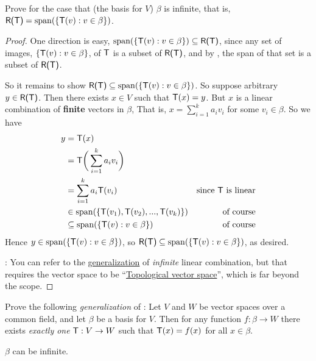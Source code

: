 \begin{exercise} \label{exercise 2.1.34}
Prove  for the case that (the basis for \(V\)) \(\beta\) is infinite,
that is, \(\textsf{R(T)} = \operatorname{span}(\{ \textsf{T}(v) : v \in \beta \})\).
\end{exercise}

\begin{proof}
One direction is easy, \(\operatorname{span}(\{ \textsf{T}(v) : v \in \beta \}) \subseteq \textsf{R(T)}\), since any set of images, \(\{ \textsf{T}(v) : v \in \beta \}\), of \(\textsf{T}\) is a subset of \(\textsf{R(T)}\), and by , the span of that set is a subset of \(\textsf{R(T)}\).

So it remains to show \(\textsf{R(T)} \subseteq \operatorname{span}(\{ \textsf{T}(v) : v \in \beta \})\).
So suppose arbitrary \(y \in \textsf{R(T)}\).
Then there exists \(x \in V\) such that \(\textsf{T}(x) = y\).
But \(x\) is a linear combination of \textbf{finite}\RED{*} vectors in \(\beta\),
That is, \(x = \sum_{i = 1}^k a_i v_i\) for some \(v_i \in \beta\).
So we have
\begin{align*}
    y & = \textsf{T}(x) \\
      & = \textsf{T}\bigg(\sum_{i = 1}^k a_i v_i\bigg) \\
      & = \sum_{i = 1}^k a_i \textsf{T}(v_i) & \text{since \(\textsf{T}\) is linear} \\
      & \in \operatorname{span}(\{ \textsf{T}(v_1), \textsf{T}(v_2), ..., \textsf{T}(v_k) \}) & \text{of course} \\
      & \subseteq \operatorname{span}(\{ \textsf{T}(v) : v \in \beta \}) & \text{of course}
\end{align*}
Hence \(y \in \operatorname{span}(\{ \textsf{T}(v) : v \in \beta \})\), so \(\textsf{R(T)} \subseteq \operatorname{span}(\{ \textsf{T}(v) : v \in \beta \})\), as desired.

\RED{*}: You can refer to the \href{https://www.wikiwand.com/en/Linear_combination#/Generalizations}{generalization} of \emph{infinite} linear combination, but that requires the vector space to be ``\href{https://www.wikiwand.com/en/Topological_vector_space}{Topological vector space}'', which is far beyond the scope.
\end{proof}

\begin{exercise} \label{exercise 2.1.35}
Prove the following \emph{generalization} of :
Let \(V\) and \(W\) be vector spaces over a common field, and let \(\beta\) be a basis for \(V\).
Then for any function \(f: \beta \to W\) there exists \emph{exactly one} \LTRAN{} \(\textsf{T}: V \to W\) such that \(\textsf{T}(x) = f(x)\) for all \(x \in \beta\).

 \(\beta\) can be infinite.
\end{exercise}

